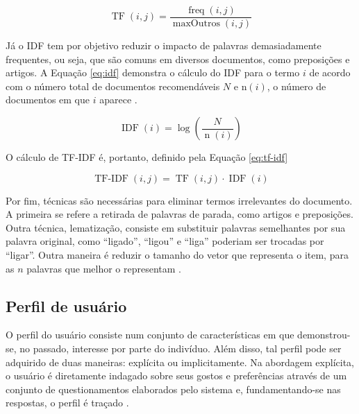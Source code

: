     \begin{equation}
        \operatorname{TF}(i,j) = \frac{\operatorname{freq}(i,j)}{\operatorname{maxOutros}(i,j)} \label{eq:tf}
    \end{equation}
    
    Já o IDF tem por objetivo reduzir o impacto de palavras demasiadamente frequentes, ou seja, que são comuns em diversos documentos, como preposições e artigos. A Equação \ref{eq:idf} demonstra o cálculo do IDF para o termo $i$ de acordo com o número total de documentos recomendáveis $N$ e $\mathrm{n}(i)$, o número de documentos em que $i$ aparece \cite{Jannach2010}.
    
    \begin{equation}
        \operatorname{IDF}(i) = \log\left(\frac{N}{\operatorname{n}(i)}\right) \label{eq:idf}
    \end{equation}
        
    O cálculo de TF-IDF é, portanto, definido pela Equação \ref{eq:tf-idf}
    
    \begin{equation}
        \operatorname{TF-IDF}(i,j) = \operatorname{TF}(i, j)\cdot \operatorname{IDF}(i) \label{eq:tf-idf}
    \end{equation}

    
    Por fim, técnicas são necessárias para eliminar termos irrelevantes do documento. A primeira se refere a retirada de palavras de parada, como artigos e preposições. Outra técnica, lematização, consiste em substituir palavras semelhantes por sua palavra original, como ``ligado'', ``ligou'' e ``liga'' poderiam ser trocadas por ``ligar''. Outra maneira é reduzir o tamanho do vetor que representa o item, para as $n$ palavras que melhor o representam \cite{Jannach2010}.
    
     
    \subsection{Perfil de usuário}
    
    O perfil do usuário consiste num conjunto de características em que demonstrou-se, no passado, interesse por parte do indivíduo. Além disso, tal perfil pode ser adquirido de duas maneiras: explícita ou implicitamente. Na abordagem explícita, o usuário é diretamente indagado sobre seus gostos e preferências através de um conjunto de questionamentos elaborados pelo sistema e, fundamentando-se nas respostas, o perfil é traçado \cite{Adomavicius2005}.
    
